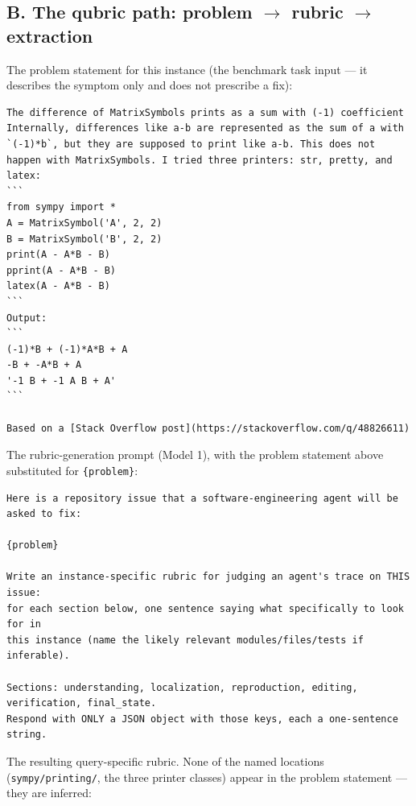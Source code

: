 \documentclass[10pt,twocolumn]{article}
\begin{document}
\subsection*{B. The qubric path: problem $\to$ rubric $\to$ extraction}
The problem statement for this instance (the benchmark task input --- it
describes the symptom only and does not prescribe a fix):

\begin{lstlisting}
The difference of MatrixSymbols prints as a sum with (-1) coefficient
Internally, differences like a-b are represented as the sum of a with `(-1)*b`, but they are supposed to print like a-b. This does not happen with MatrixSymbols. I tried three printers: str, pretty, and latex: 
```
from sympy import *
A = MatrixSymbol('A', 2, 2)
B = MatrixSymbol('B', 2, 2)
print(A - A*B - B)
pprint(A - A*B - B)
latex(A - A*B - B)
```
Output:
```
(-1)*B + (-1)*A*B + A
-B + -A*B + A
'-1 B + -1 A B + A'
```

Based on a [Stack Overflow post](https://stackoverflow.com/q/48826611)
\end{lstlisting}

\noindent The rubric-generation prompt (Model 1), with the problem statement
above substituted for \texttt{\{problem\}}:

\begin{lstlisting}
Here is a repository issue that a software-engineering agent will be asked to fix:

{problem}

Write an instance-specific rubric for judging an agent's trace on THIS issue:
for each section below, one sentence saying what specifically to look for in
this instance (name the likely relevant modules/files/tests if inferable).

Sections: understanding, localization, reproduction, editing, verification, final_state.
Respond with ONLY a JSON object with those keys, each a one-sentence string.
\end{lstlisting}

\noindent The resulting query-specific rubric. None of the named locations
(\texttt{sympy/printing/}, the three printer classes) appear in the problem
statement --- they are inferred:
\end{document}
